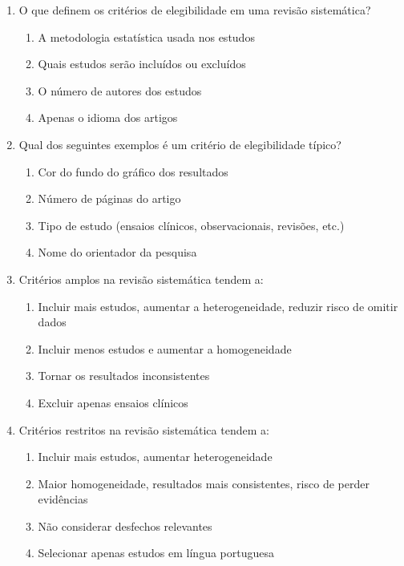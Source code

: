 \documentclass[12pt,a4paper]{article}
\begin{document}
\begin{enumerate}

\item O que definem os critérios de elegibilidade em uma revisão sistemática?
\begin{enumerate}
    \item A metodologia estatística usada nos estudos
    \item Quais estudos serão incluídos ou excluídos
    \item O número de autores dos estudos
    \item Apenas o idioma dos artigos
\end{enumerate}

\item Qual dos seguintes exemplos é um critério de elegibilidade típico?
\begin{enumerate}
    \item Cor do fundo do gráfico dos resultados
    \item Número de páginas do artigo
    \item Tipo de estudo (ensaios clínicos, observacionais, revisões, etc.)
    \item Nome do orientador da pesquisa
\end{enumerate}

\item Critérios amplos na revisão sistemática tendem a:
\begin{enumerate}
    \item Incluir mais estudos, aumentar a heterogeneidade, reduzir risco de omitir dados
    \item Incluir menos estudos e aumentar a homogeneidade
    \item Tornar os resultados inconsistentes
    \item Excluir apenas ensaios clínicos
\end{enumerate}

\item Critérios restritos na revisão sistemática tendem a:
\begin{enumerate}
    \item Incluir mais estudos, aumentar heterogeneidade
    \item Maior homogeneidade, resultados mais consistentes, risco de perder evidências
    \item Não considerar desfechos relevantes
    \item Selecionar apenas estudos em língua portuguesa
\end{enumerate}


\end{enumerate}
\end{document}
